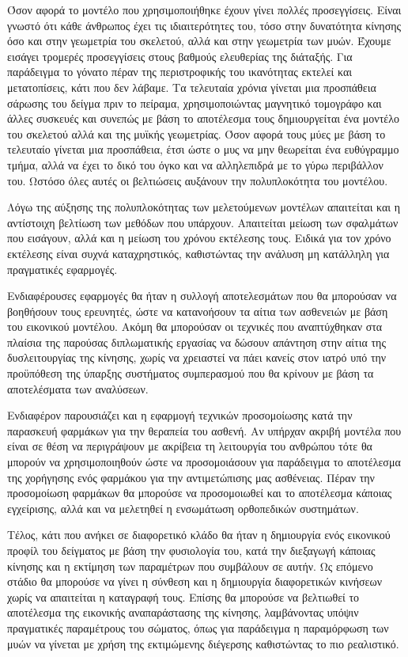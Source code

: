 Όσον αφορά το μοντέλο που χρησιμοποιήθηκε έχουν γίνει πολλές προσεγγίσεις. Είναι γνωστό ότι κάθε άνθρωπος έχει τις ιδιαιτερότητες του, τόσο στην δυνατότητα κίνησης όσο και στην γεωμετρία του σκελετού, αλλά και στην γεωμετρία των μυών. Έχουμε εισάγει τρομερές προσεγγίσεις στους βαθμούς ελευθερίας της διάταξής. Για παράδειγμα το γόνατο πέραν της περιστροφικής του ικανότητας εκτελεί και μετατοπίσεις, κάτι που δεν λάβαμε. Τα τελευταία χρόνια γίνεται μια προσπάθεια σάρωσης του δείγμα πριν το πείραμα, χρησιμοποιώντας μαγνητικό τομογράφο και άλλες συσκευές και συνεπώς με βάση το αποτέλεσμα τους δημιουργείται ένα μοντέλο του σκελετού αλλά και της μυϊκής γεωμετρίας. Όσον αφορά τους μύες με βάση το τελευταίο γίνεται μια προσπάθεια, έτσι ώστε ο μυς να μην θεωρείται ένα ευθύγραμμο τμήμα, αλλά να έχει το δικό του όγκο και να αλληλεπιδρά με το γύρω περιβάλλον του. Ωστόσο όλες αυτές οι βελτιώσεις αυξάνουν την πολυπλοκότητα του μοντέλου.

Λόγω της αύξησης της πολυπλοκότητας των μελετούμενων μοντέλων απαιτείται και η αντίστοιχη βελτίωση των μεθόδων που υπάρχουν. Απαιτείται μείωση των σφαλμάτων που εισάγουν, αλλά και η μείωση του χρόνου εκτέλεσης τους. Ειδικά για τον χρόνο εκτέλεσης είναι συχνά καταχρηστικός, καθιστώντας την ανάλυση μη κατάλληλη για πραγματικές εφαρμογές.

Ενδιαφέρουσες εφαρμογές θα ήταν η συλλογή αποτελεσμάτων που θα μπορούσαν να βοηθήσουν τους ερευνητές, ώστε να κατανοήσουν τα αίτια των ασθενειών με βάση του εικονικού μοντέλου. Ακόμη θα μπορούσαν οι τεχνικές που αναπτύχθηκαν στα πλαίσια της παρούσας διπλωματικής εργασίας να δώσουν απάντηση στην αίτια της δυσλειτουργίας της κίνησης, χωρίς να χρειαστεί να πάει κανείς στον ιατρό υπό την προϋπόθεση της ύπαρξης συστήματος συμπερασμού που θα κρίνουν με βάση τα αποτελέσματα των αναλύσεων.

Ενδιαφέρον παρουσιάζει και η εφαρμογή τεχνικών προσομοίωσης κατά την παρασκευή φαρμάκων για την θεραπεία του ασθενή. Αν υπήρχαν ακριβή μοντέλα που είναι σε θέση να περιγράψουν με ακρίβεια τη λειτουργία του ανθρώπου τότε θα μπορούν να χρησιμοποιηθούν ώστε να προσομοιάσουν για παράδειγμα το αποτέλεσμα της χορήγησης ενός φαρμάκου για την αντιμετώπισης μας ασθένειας. Πέραν την προσομοίωση φαρμάκων θα μπορούσε να προσομοιωθεί και το αποτέλεσμα κάποιας εγχείρισης, αλλά και να μελετηθεί η ενσωμάτωση ορθοπεδικών συστημάτων.

Τέλος, κάτι που ανήκει σε διαφορετικό κλάδο θα ήταν η δημιουργία ενός εικονικού προφίλ του δείγματος με βάση την φυσιολογία του, κατά την διεξαγωγή κάποιας κίνησης και η εκτίμηση των παραμέτρων που συμβάλουν σε αυτήν. Ως επόμενο στάδιο θα μπορούσε να γίνει η σύνθεση και η δημιουργία διαφορετικών κινήσεων χωρίς να απαιτείται η καταγραφή τους. Επίσης θα μπορούσε να βελτιωθεί το αποτέλεσμα της εικονικής αναπαράστασης της κίνησης, λαμβάνοντας υπόψιν πραγματικές παραμέτρους του σώματος, όπως για παράδειγμα η παραμόρφωση των μυών να γίνεται με χρήση της εκτιμώμενης διέγερσης καθιστώντας το πιο ρεαλιστικό.

